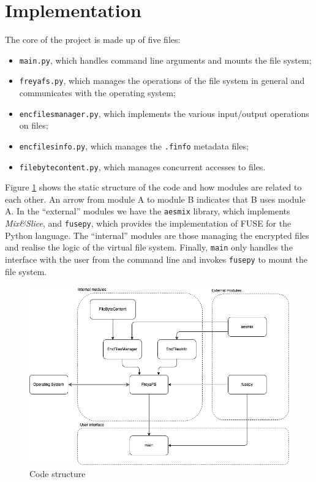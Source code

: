 \documentclass[a4paper,12pt,twoside,openright]{report}
\begin{document}
  \section{Implementation}

  The core of the project is made up of five files:

  \begin{itemize}
    \item \texttt{main.py}, which handles command line arguments and mounts the file system;
    \item \texttt{freyafs.py}, which manages the operations of the file system in general and communicates with the operating system;
    \item \texttt{encfilesmanager.py}, which implements the various input/output operations on files;
    \item \texttt{encfilesinfo.py}, which manages the \texttt{.finfo} metadata files;
    \item \texttt{filebytecontent.py}, which manages concurrent accesses to files.
  \end{itemize}

  Figure \ref{struttura-statica} shows the static structure of the code and how modules are related to each other.
  An arrow from module A to module B indicates that B uses module A.
  In the ``external'' modules we have the \texttt{aesmix} library, which implements \textit{Mix\&Slice}, and
  \texttt{fusepy}, which provides the implementation of FUSE for the Python language.
  The ``internal'' modules are those managing the encrypted files and realise the logic of the virtual file system.
  Finally, \texttt{main} only handles the interface with the user from the command line and invokes
  \texttt{fusepy} to mount the file system.

  \begin{figure}
    \centering
    \includegraphics[width=0.8\linewidth]{images/code-diagram-en.png}
    \caption{Code structure}
    \label{struttura-statica}
  \end{figure}
\end{document}
